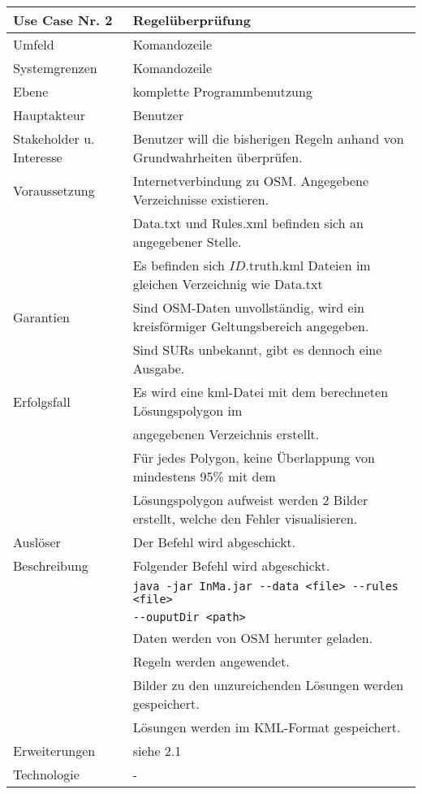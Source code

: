 \begin{tabular}{| l | l |}
 \hline
 \textbf{Use Case Nr. 2} & Regelüberprüfung \\
 \hline
 Umfeld & Komandozeile\\
 \hline
 Systemgrenzen & Komandozeile\\
 \hline
 Ebene & komplette Programmbenutzung\\
 \hline
 Hauptakteur & Benutzer\\
 \hline
 Stakeholder u. Interesse & Benutzer will die bisherigen Regeln anhand von Grundwahrheiten überprüfen.\\
 \hline
 Voraussetzung & Internetverbindung zu OSM. Angegebene Verzeichnisse existieren.\\
	      & Data.txt und Rules.xml befinden sich an angegebener Stelle. \\
	      & Es befinden sich $ID$.truth.kml Dateien im gleichen Verzeichnig wie Data.txt \\
 \hline
 Garantien & Sind OSM-Daten unvollständig, wird ein kreisförmiger Geltungsbereich angegeben.\\
	  & Sind SURs unbekannt, gibt es dennoch eine Ausgabe.\\
 \hline
 Erfolgsfall & Es wird eine kml-Datei mit dem berechneten Lösungspolygon im\\
	    & angegebenen Verzeichnis erstellt.\\
	    & Für jedes Polygon, keine Überlappung von mindestens 95\% mit dem \\
	    & Lösungspolygon aufweist werden 2 Bilder erstellt, welche den Fehler visualisieren.\\
 \hline
 Auslöser & Der Befehl wird abgeschickt.\\
 \hline
 Beschreibung & Folgender Befehl wird abgeschickt.\\
	    & \verb|java -jar InMa.jar --data <file> --rules <file>|\\
	    & \hspace{24pt} \verb|--ouputDir <path>|\\
	    & Daten werden von OSM herunter geladen.\\
	    & Regeln werden angewendet.\\
	    & Bilder zu den unzureichenden Lösungen werden gespeichert.\\
	    & Lösungen werden im KML-Format gespeichert.\\
 \hline
 Erweiterungen & siehe 2.1\\
 \hline
 Technologie & -\\
 \hline
\end{tabular}


